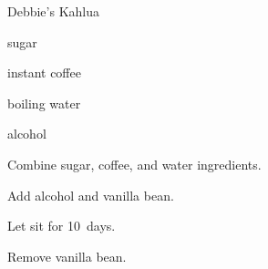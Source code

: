 \begin{recipe}{Debbie's Kahlua}{}{}

\begin{ingredients}
\item {} sugar
\item {} instant coffee
\item {} boiling water
\item {} alcohol
\end{ingredients}

\begin{directions}
\item Combine sugar, coffee, and water ingredients.
\item Add alcohol and vanilla bean.
\item Let sit for 10~days.
\item Remove vanilla bean.
\end{directions}

\hint{}
\end{recipe}
